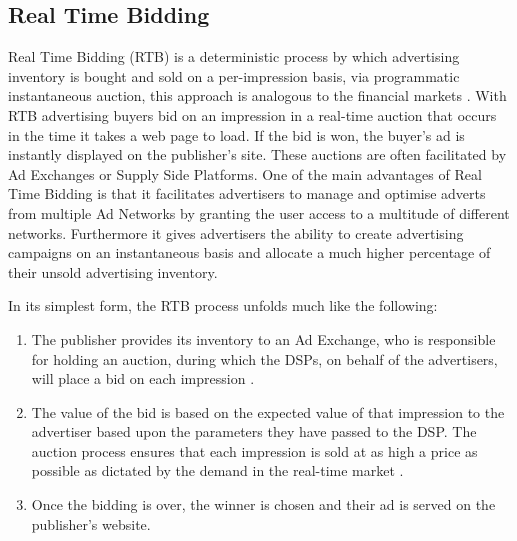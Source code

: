 \documentclass[12pt]{article}
\begin{document}
\subsection{Real Time Bidding}
Real Time Bidding (RTB) is a deterministic process by which advertising inventory is bought and sold on a per-impression basis, via programmatic instantaneous auction, this approach is analogous to the financial markets \parencite{RTB}. With RTB advertising buyers bid on an impression in a real-time auction that occurs in the time it takes a web page to load. If the bid is won, the buyer's ad is instantly displayed on the publisher's site. These auctions are often facilitated by Ad Exchanges or Supply Side Platforms. One of the main advantages of Real Time Bidding is that it facilitates advertisers to manage and optimise adverts from multiple Ad Networks by granting the user access to a multitude of different networks. Furthermore it gives advertisers the ability to create advertising campaigns on an instantaneous basis and allocate a much higher percentage of their unsold advertising inventory. \newline

In its simplest form, the RTB process unfolds much like the following: 
\begin{enumerate}
\item The publisher provides its inventory to an Ad Exchange, who is responsible for holding an auction, during which the DSPs, on behalf of the advertisers, will place a bid on each impression \parencite{howRTBWorks}. 
\item The value of the bid is based on the expected value of that impression to the advertiser based upon the parameters they have passed to the DSP. The auction process ensures that each impression is sold at as high a price as possible as dictated by the demand in the real-time market \parencite{howRTBWorks}. 
\item Once the bidding is over, the winner is chosen and their ad is served on the publisher's website. 
\end{enumerate}
\end{document}
